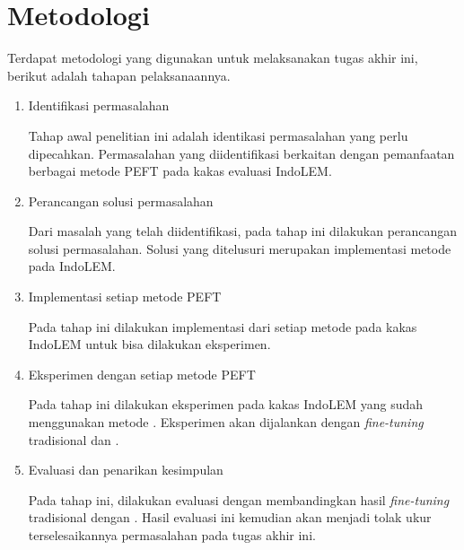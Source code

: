 \section{Metodologi}

Terdapat metodologi yang digunakan untuk melaksanakan tugas akhir ini, berikut adalah tahapan pelaksanaannya.

\begin{enumerate}
    \item Identifikasi permasalahan

    Tahap awal penelitian ini adalah identikasi permasalahan yang perlu dipecahkan. Permasalahan yang diidentifikasi berkaitan dengan pemanfaatan berbagai metode PEFT pada kakas evaluasi IndoLEM.

    \item Perancangan solusi permasalahan

    Dari masalah yang telah diidentifikasi, pada tahap ini dilakukan perancangan solusi permasalahan. Solusi yang ditelusuri merupakan implementasi metode \PEFT pada IndoLEM.

    \item Implementasi setiap metode PEFT

    Pada tahap ini dilakukan implementasi dari setiap metode \PEFT pada kakas IndoLEM untuk bisa dilakukan eksperimen.

    \item Eksperimen dengan setiap metode PEFT

    Pada tahap ini dilakukan eksperimen pada kakas IndoLEM yang sudah menggunakan metode \PEFT. Eksperimen akan dijalankan dengan \textit{fine-tuning} tradisional dan \PEFT.

    \item Evaluasi dan penarikan kesimpulan

    Pada tahap ini, dilakukan evaluasi dengan membandingkan hasil \textit{fine-tuning} tradisional dengan \PEFT. Hasil evaluasi ini kemudian akan menjadi tolak ukur terselesaikannya permasalahan pada tugas akhir ini.

\end{enumerate}
